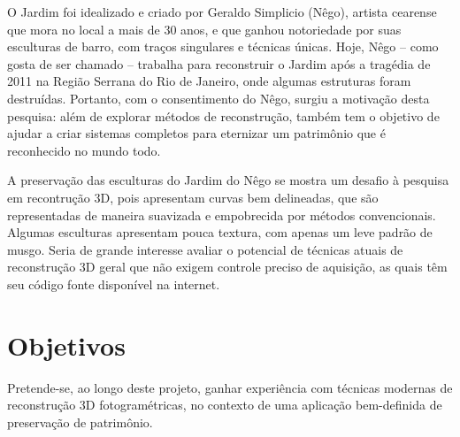 

O Jardim foi idealizado e criado por Geraldo Simplicio (Nêgo), artista cearense que mora no
local a mais de 30 anos, e que ganhou notoriedade por suas esculturas de barro,
com traços singulares e técnicas únicas. Hoje, Nêgo -- como gosta de ser chamado
-- trabalha para reconstruir o Jardim após a tragédia de 2011 na Região Serrana
do Rio de Janeiro, onde algumas estruturas foram destruídas. Portanto, com o
consentimento do Nêgo, surgiu a motivação desta pesquisa: além de explorar
métodos de reconstrução, também tem o objetivo de ajudar a criar sistemas
completos para eternizar um patrimônio que é reconhecido no mundo todo.

A preservação das esculturas do Jardim do Nêgo se mostra um desafio à pesquisa em
recontrução 3D, pois apresentam curvas bem delineadas, que são 
representadas de maneira suavizada e empobrecida por métodos convencionais.
Algumas esculturas apresentam pouca textura, com apenas um leve padrão de musgo.
Seria de grande interesse avaliar o potencial de técnicas atuais de
reconstrução 3D geral que não exigem controle preciso de aquisição, as quais têm seu código fonte
disponível na internet.

\section*{Objetivos}\label{sec:objetivos}

Pretende-se, ao longo deste projeto, ganhar experiência com técnicas
modernas de reconstrução 3D fotogramétricas, no contexto de uma aplicação
bem-definida de preservação de patrimônio. 

